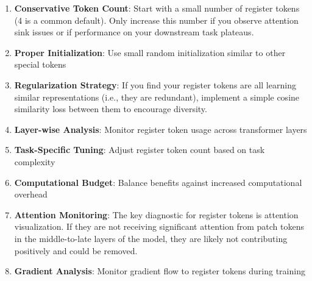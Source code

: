 \begin{enumerate}
\item \textbf{Conservative Token Count}: Start with a small number of register tokens (4 is a common default). Only increase this number if you observe attention sink issues or if performance on your downstream task plateaus.
\item \textbf{Proper Initialization}: Use small random initialization similar to other special tokens
\item \textbf{Regularization Strategy}: If you find your register tokens are all learning similar representations (i.e., they are redundant), implement a simple cosine similarity loss between them to encourage diversity.
\item \textbf{Layer-wise Analysis}: Monitor register token usage across transformer layers
\item \textbf{Task-Specific Tuning}: Adjust register token count based on task complexity
\item \textbf{Computational Budget}: Balance benefits against increased computational overhead
\item \textbf{Attention Monitoring}: The key diagnostic for register tokens is attention visualization. If they are not receiving significant attention from patch tokens in the middle-to-late layers of the model, they are likely not contributing positively and could be removed.
\item \textbf{Gradient Analysis}: Monitor gradient flow to register tokens during training
\end{enumerate}
\begin{comment}
Feedback: This is a good list. To make it more actionable and direct for a practitioner:
1.  **Conservative Token Count**: "Start with a small number of register tokens (4 is a common default). Only increase this number if you observe attention sink issues or if performance on your downstream task plateaus."
2.  **Regularization Strategy**: "If you find your register tokens are all learning similar representations (i.e., they are redundant), implement a simple cosine similarity loss between them to encourage diversity."
3.  **Attention Monitoring**: "The key diagnostic for register tokens is attention visualization. If they are not receiving significant attention from patch tokens in the middle-to-late layers of the model, they are likely not contributing positively and could be removed."
STATUS: addressed - updated all three best practices with more specific, actionable guidance
\end{comment}

